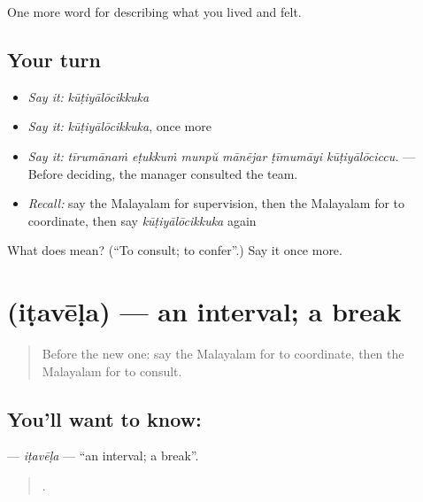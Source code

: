 \begin{grammarlens}[title={What you've built}]
One more word for describing what you lived and felt.
\end{grammarlens}

\subsection*{Your turn}
\begin{itemize}
\raggedright
  \item \emph{Say it:} \emph{kūṭiyālōcikkuka}
  \item \emph{Say it:} \emph{kūṭiyālōcikkuka}, once more
  \item \emph{Say it:} \emph{tīrumānaṁ eṭukkuṁ munpŭ mānējar ṭīmumāyi kūṭiyālōciccu.} — Before deciding, the manager consulted the team.
  \item \emph{Recall:} say the Malayalam for supervision, then the Malayalam for to coordinate, then say \emph{kūṭiyālōcikkuka} again
\end{itemize}

\begin{tcolorbox}[breakable,colback=teal!4,colframe=teal!35!black,title={Before you move on}]
What does  mean? (\textquotedblleft{}To consult; to confer\textquotedblright{}.) Say it once more.
\end{tcolorbox}
\section[\texorpdfstring{\ml{ഇടവേള} (iṭavēḷa)}{ഇടവേള (iṭavēḷa)}]{ (iṭavēḷa) — an interval; a break}

\label{lesson:ML-C550-itavela}



\begin{quote}
Before the new one: say the Malayalam for to coordinate, then the Malayalam for to consult.
\end{quote}

\subsection*{You'll want to know: }
\textbf{} — \emph{iṭavēḷa} — \textquotedblleft{}an interval; a break\textquotedblright{}.

\begin{quote}
       .
\end{quote}

